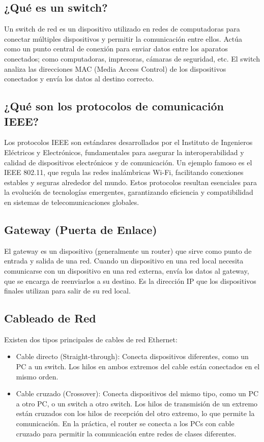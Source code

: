 \documentclass[letterpaper,12pt,oneside]{article}
\begin{document}
\subsection*{¿Qué es un switch?}
Un switch de red es un dispositivo utilizado en redes de computadoras para conectar múltiples dispositivos y permitir la comunicación entre ellos. Actúa como un punto central de conexión para enviar datos entre los aparatos conectados; como computadoras, impresoras, cámaras de seguridad, etc. El switch analiza las direcciones MAC (Media Access Control) de los dispositivos conectados y envía los datos al destino correcto.

\subsection*{¿Qué son los protocolos de comunicación IEEE?}
Los protocolos IEEE son estándares desarrollados por el Instituto de Ingenieros Eléctricos y Electrónicos, fundamentales para asegurar la interoperabilidad y calidad de dispositivos electrónicos y de comunicación. Un ejemplo famoso es el IEEE 802.11, que regula las redes inalámbricas Wi-Fi, facilitando conexiones estables y seguras alrededor del mundo. Estos protocolos resultan esenciales para la evolución de tecnologías emergentes, garantizando eficiencia y compatibilidad en sistemas de telecomunicaciones globales.

\subsection*{Gateway (Puerta de Enlace)}
El gateway es un dispositivo (generalmente un router) que sirve como punto de entrada y salida de una red. Cuando un dispositivo en una red local necesita comunicarse con un dispositivo en una red externa, envía los datos al gateway, que se encarga de reenviarlos a su destino. Es la dirección IP que los dispositivos finales utilizan para salir de su red local.

\subsection*{Cableado de Red}
Existen dos tipos principales de cables de red Ethernet:
\begin{itemize}
    \item Cable directo (Straight-through): Conecta dispositivos diferentes, como un PC a un switch. Los hilos en ambos extremos del cable están conectados en el mismo orden.
    \item Cable cruzado (Crossover): Conecta dispositivos del mismo tipo, como un PC a otro PC, o un switch a otro switch. Los hilos de transmisión de un extremo están cruzados con los hilos de recepción del otro extremo, lo que permite la comunicación. En la práctica, el router se conecta a los PCs con cable cruzado para permitir la comunicación entre redes de clases diferentes.
\end{itemize}
\clearpage
\end{document}
